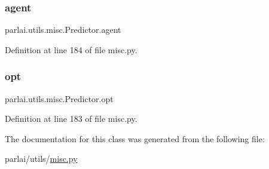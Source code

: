 \subsubsection{\texorpdfstring{agent}{agent}}
{\footnotesize\ttfamily parlai.\+utils.\+misc.\+Predictor.\+agent}



Definition at line 184 of file misc.\+py.

\mbox{\label{classparlai_1_1utils_1_1misc_1_1Predictor_a608b3d7f6722389f3a7eeed0ec5772b7}} 
\subsubsection{\texorpdfstring{opt}{opt}}
{\footnotesize\ttfamily parlai.\+utils.\+misc.\+Predictor.\+opt}



Definition at line 183 of file misc.\+py.



The documentation for this class was generated from the following file\+:\begin{DoxyCompactItemize}
\item 
parlai/utils/\hyperlink{misc_8py}{misc.\+py}\end{DoxyCompactItemize}
